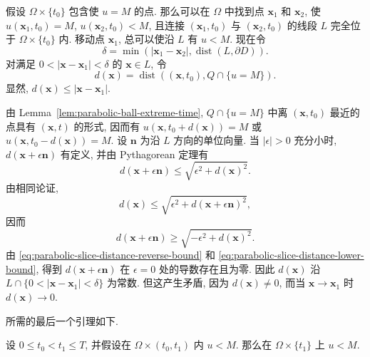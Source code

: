 \begin{Proof}
假设 $\Omega\times\{t_0\}$ 包含使 $u=M$ 的点. 那么可以在 $\Omega$ 中找到点 $\bm{x}_1$ 和 $\bm{x}_2$, 使 $u(\bm{x}_1,t_0)=M$, $u(\bm{x}_2,t_0)<M$, 且连接 $(\bm{x}_1,t_0)$ 与 $(\bm{x}_2,t_0)$ 的线段 $L$ 完全位于 $\Omega\times\{t_0\}$ 内. 移动点 $\bm{x}_1$, 总可以使沿 $L$ 有 $u<M$. 现在令
\begin{equation}\label{eq:parabolic-slice-distance-radius}
\delta=\min(|\bm{x}_1-\bm{x}_2|,\operatorname{dist}(L,\partial D)).
\end{equation}
对满足 $0<|\bm{x}-\bm{x}_1|<\delta$ 的 $\bm{x}\in L$, 令
\begin{equation}\label{eq:parabolic-slice-maximum-set-distance}
d(\bm{x})=\operatorname{dist}((\bm{x},t_0),Q\cap\{u=M\}).
\end{equation}
显然, $d(\bm{x})\leq|\bm{x}-\bm{x}_1|$.

由 Lemma~\ref{lem:parabolic-ball-extreme-time}, $Q\cap\{u=M\}$ 中离 $(\bm{x},t_0)$ 最近的点具有 $(\bm{x},t)$ 的形式, 因而有 $u(\bm{x},t_0+d(\bm{x}))=M$ 或 $u(\bm{x},t_0-d(\bm{x}))=M$. 设 $\bm{n}$ 为沿 $L$ 方向的单位向量. 当 $|\epsilon|>0$ 充分小时, $d(\bm{x}+\epsilon\bm{n})$ 有定义, 并由 Pythagorean 定理有
\begin{equation}\label{eq:parabolic-slice-distance-forward-bound}
d(\bm{x}+\epsilon\bm{n})\leq\sqrt{\epsilon^2+d(\bm{x})^2}.
\end{equation}
由相同论证,
\begin{equation}\label{eq:parabolic-slice-distance-reverse-bound}
d(\bm{x})\leq\sqrt{\epsilon^2+d(\bm{x}+\epsilon\bm{n})^2},
\end{equation}
因而
\begin{equation}\label{eq:parabolic-slice-distance-lower-bound}
d(\bm{x}+\epsilon\bm{n})\geq\sqrt{-\epsilon^2+d(\bm{x})^2}.
\end{equation}
由 \eqref{eq:parabolic-slice-distance-reverse-bound} 和 \eqref{eq:parabolic-slice-distance-lower-bound}, 得到 $d(\bm{x}+\epsilon\bm{n})$ 在 $\epsilon=0$ 处的导数存在且为零. 因此 $d(\bm{x})$ 沿 $L\cap\{0<|\bm{x}-\bm{x}_1|<\delta\}$ 为常数. 但这产生矛盾, 因为 $d(\bm{x})\ne0$, 而当 $\bm{x}\to\bm{x}_1$ 时 $d(\bm{x})\to0$.
\end{Proof}

所需的最后一个引理如下.

\begin{Lemma}
\label{lem:parabolic-time-strictness}
设 $0\leq t_0<t_1\leq T$, 并假设在 $\Omega\times(t_0,t_1)$ 内 $u<M$. 那么在 $\Omega\times\{t_1\}$ 上 $u<M$.
\end{Lemma}

